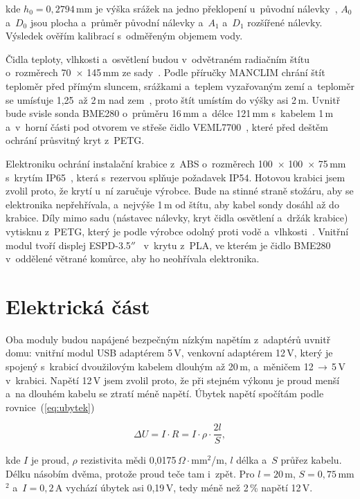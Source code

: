 \noindent kde $h_0 = 0{,}2794$\,mm je výška srážek na jedno překlopení u~původní nálevky~\cite{srazkomerrg}, $A_0$ a~$D_0$ jsou plocha a~průměr původní nálevky a~$A_1$ a~$D_1$ rozšířené nálevky. Výsledek ověřím kalibrací s~odměřeným objemem vody.

Čidla teploty, vlhkosti a~osvětlení budou v~odvětraném radiačním štítu o~rozměrech 70~$\times$ 145\,mm ze sady~\cite{sadacidel}. Podle příručky MANCLIM chrání štít teploměr před přímým sluncem, srážkami a~teplem vyzařovaným zemí a~teploměr se umísťuje 1,25~až 2\,m nad zem~\cite{manclim}, proto štít umístím do výšky asi 2\,m. Uvnitř bude svisle sonda BME280 o~průměru 16\,mm a~délce 121\,mm s~kabelem 1\,m~\cite{bmesonda} a~v~horní části pod otvorem ve střeše čidlo VEML7700~\cite{veml7700}, které před deštěm ochrání průsvitný kryt z~PETG.

Elektroniku ochrání instalační krabice z~ABS o~rozměrech 100~$\times$ 100~$\times$ 75\,mm s~krytím IP65~\cite{krabice}, která s~rezervou splňuje požadavek IP54. Hotovou krabici jsem zvolil proto, že krytí u~ní zaručuje výrobce. Bude na stinné straně stožáru, aby se elektronika nepřehřívala, a~nejvýše 1\,m od štítu, aby kabel sondy dosáhl až do krabice. Díly mimo sadu (nástavec nálevky, kryt čidla osvětlení a~držák krabice) vytisknu z~PETG, který je podle výrobce odolný proti vodě a~vlhkosti~\cite{prusapetg}. Vnitřní modul tvoří displej ESPD-3.5$''$~\cite{espd} v~krytu z~PLA, ve kterém je čidlo BME280~\cite{bmemodul} v~oddělené větrané komůrce, aby ho neohřívala elektronika.

\section{Elektrická část}

Oba moduly budou napájené bezpečným nízkým napětím z~adaptérů uvnitř domu: vnitřní modul USB adaptérem 5\,V, venkovní adaptérem 12\,V, který je spojený s~krabicí dvoužilovým kabelem dlouhým až 20\,m, a~měničem 12\,$\rightarrow$\,5\,V v~krabici. Napětí 12\,V jsem zvolil proto, že při stejném výkonu je proud menší a~na dlouhém kabelu se ztratí méně napětí. Úbytek napětí spočítám podle rovnice~(\ref{eq:ubytek})

\begin{equation}
\Delta U = I \cdot R = I \cdot \rho \cdot \frac{2l}{S},
\label{eq:ubytek}
\end{equation}

\noindent kde $I$ je proud, $\rho$ rezistivita mědi 0,0175\,$\Omega\cdot$mm$^2$/m, $l$ délka a~$S$ průřez kabelu. Délku násobím dvěma, protože proud teče tam i~zpět. Pro $l = 20$\,m, $S = 0{,}75$\,mm$^2$ a~$I = 0{,}2$\,A vychází úbytek asi 0,19\,V, tedy méně než 2\,\% napětí 12\,V.

